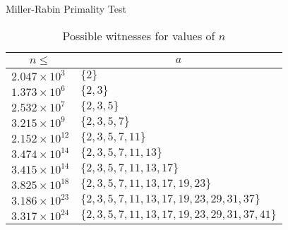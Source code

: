 \begin{algorithm}[ht]
    \inputminted[linenos, frame=lines]{python}{./code/algorithms/miller_test.py}
    \caption{Miller-Rabin Primality Test}
\end{algorithm}

\begin{table}[ht]
    \centering
    \begin{tabular}{l|l}
        \multicolumn{1}{c|}{$n \leq$} & \multicolumn{1}{|c}{$a$}\\
        \hline
        $2.047 \times 10^3$    & $\{2\}$\\
        $1.373 \times 10^6$    & $\{2, 3\}$\\
        $2.532 \times 10^7$    & $\{2, 3, 5\}$\\
        $3.215 \times 10^9$    & $\{2, 3, 5, 7\}$\\
        $2.152 \times 10^{12}$ & $\{2, 3, 5, 7, 11\}$\\
        $3.474 \times 10^{14}$ & $\{2, 3, 5, 7, 11, 13\}$\\
        $3.415 \times 10^{14}$ & $\{2, 3, 5, 7, 11, 13, 17\}$\\
        $3.825 \times 10^{18}$ & $\{2, 3, 5, 7, 11, 13, 17, 19, 23\}$\\
        $3.186 \times 10^{23}$ & $\{2, 3, 5, 7, 11, 13, 17, 19, 23, 29, 31, 37\}$\\
        $3.317 \times 10^{24}$ & $\{2, 3, 5, 7, 11, 13, 17, 19, 23, 29, 31, 37, 41\}$
    \end{tabular}
    \caption{Possible witnesses for values of $n$}
\end{table}
